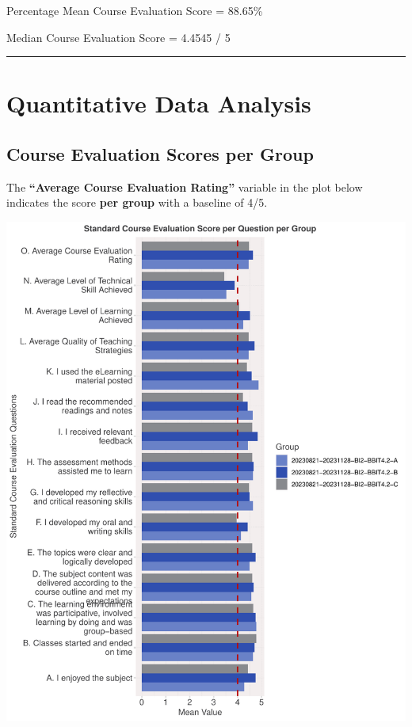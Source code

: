 \documentclass[
]{article}
\begin{document}
Percentage Mean Course Evaluation Score = 88.65\%

Median Course Evaluation Score = 4.4545 / 5

\begin{center}\rule{0.5\linewidth}{0.5pt}\end{center}

\newpage

\section{Quantitative Data Analysis}\label{quantitative-data-analysis}

\subsection{Course Evaluation Scores per
Group}\label{course-evaluation-scores-per-group}

The \textbf{``Average Course Evaluation Rating''} variable in the plot
below indicates the score \textbf{per group} with a baseline of 4/5.

\includegraphics{10.b.BBT4206-End-SemesterCourseEvaluation-20230821-20231128-BI2-BBIT4-2_files/figure-latex/VisualizationsForCourseEvaluationResultsperClassGroup-1.pdf}
\end{document}
